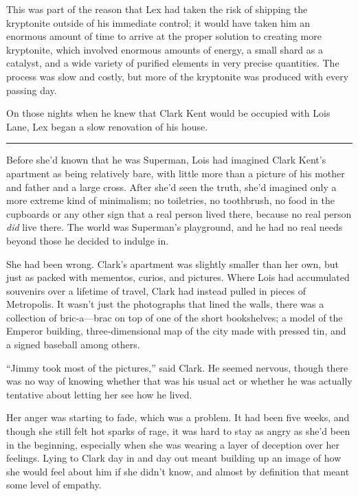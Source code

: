 This was part of the reason that Lex had taken the risk of shipping the
kryptonite outside of his immediate control; it would have taken him an
enormous amount of time to arrive at the proper solution to creating
more kryptonite, which involved enormous amounts of energy, a small
shard as a catalyst, and a wide variety of purified elements in very
precise quantities. The process was slow and costly, but more of the
kryptonite was produced with every passing day.

On those nights when he knew that Clark Kent would be occupied with Lois
Lane, Lex began a slow renovation of his house.

\begin{center}\rule{0.5\linewidth}{\linethickness}\end{center}

Before she'd known that he was Superman, Lois had imagined Clark Kent's
apartment as being relatively bare, with little more than a picture of
his mother and father and a large cross. After she'd seen the truth,
she'd imagined only a more extreme kind of minimalism; no toiletries, no
toothbrush, no food in the cupboards or any other sign that a real
person lived there, because no real person \emph{did} live there. The
world was Superman's playground, and he had no real needs beyond those
he decided to indulge in.

She had been wrong. Clark's apartment was slightly smaller than her own,
but just as packed with mementos, curios, and pictures. Where Lois had
accumulated souvenirs over a lifetime of travel, Clark had instead
pulled in pieces of Metropolis. It wasn't just the photographs that
lined the walls, there was a collection of bric‐a---brac on top of one
of the short bookshelves; a model of the Emperor building,
three‐dimensional map of the city made with pressed tin, and a signed
baseball among others.

``Jimmy took most of the pictures,'' said Clark. He seemed nervous,
though there was no way of knowing whether that was his usual act or
whether he was actually tentative about letting her see how he lived.

Her anger was starting to fade, which was a problem. It had been five
weeks, and though she still felt hot sparks of rage, it was hard to stay
as angry as she'd been in the beginning, especially when she was wearing
a layer of deception over her feelings. Lying to Clark day in and day
out meant building up an image of how she would feel about him if she
didn't know, and almost by definition that meant some level of empathy.

